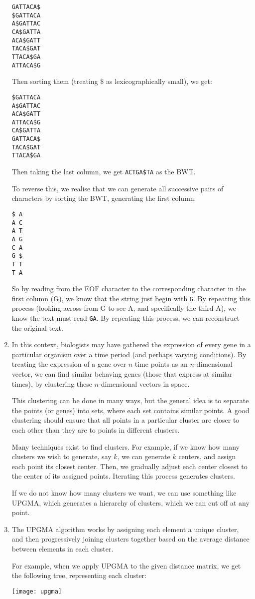 \begin{enumerate}[label=(\alph*)]
\begin{verbatim}
GATTACA$
$GATTACA
A$GATTAC
CA$GATTA
ACA$GATT
TACA$GAT
TTACA$GA
ATTACA$G
\end{verbatim}

Then sorting them (treating \$ as lexicographically small), we get:

\begin{verbatim}
$GATTACA
A$GATTAC
ACA$GATT
ATTACA$G
CA$GATTA
GATTACA$
TACA$GAT
TTACA$GA
\end{verbatim}

Then taking the last column, we get \texttt{ACTGA\$TA} as the BWT.

To reverse this, we realise that we can generate all successive pairs of characters by sorting the BWT, generating the first column:

\begin{verbatim}
$ A
A C
A T
A G
C A
G $
T T
T A
\end{verbatim}

So by reading from the EOF character to the corresponding character in the first column (G), we know that the string just begin with \texttt{G}. By repeating this process (looking across from G to see A, and specifically the third A), we know the text must read \texttt{GA}. By repeating this process, we can reconstruct the original text.

\item
  In this context, biologists may have gathered the expression of every gene in a particular organism over a time period (and perhaps varying conditions). By treating the expression of a gene over $n$ time points as an $n$-dimensional vector, we can find similar behaving genes (those that express at similar times), by clustering these $n$-dimensional vectors in space.

  This clustering can be done in many ways, but the general idea is to separate the points (or genes) into sets, where each set contains similar points. A good clustering should ensure that all points in a particular cluster are closer to each other than they are to points in different clusters.

  Many techniques exist to find clusters. For example, if we know how many clusters we wish to generate, say $k$, we can generate $k$ centers, and assign each point its closest center. Then, we gradually adjust each center closest to the center of its assigned points. Iterating this process generates clusters.

  If we do not know how many clusters we want, we can use something like UPGMA, which generates a hierarchy of clusters, which we can cut off at any point.

\item
  The UPGMA algorithm works by assigning each element a unique cluster, and then progressively joining clusters together based on the average distance between elements in each cluster.

  For example, when we apply UPGMA to the given distance matrix, we get the following tree, representing each cluster:

  \texttt{[image: upgma]}


\end{enumerate}

